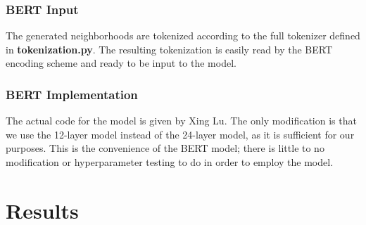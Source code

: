 \documentclass[12pt, a4paper]{article}
\begin{document}
\subsubsection{BERT Input}
The generated neighborhoods are tokenized according to the full tokenizer defined in \textbf{tokenization.py}. The resulting tokenization is easily read by the BERT encoding scheme and ready to be input to the model.


\subsubsection{BERT Implementation}
The actual code for the model is given by Xing Lu. The only modification is that we use the 12-layer model instead of the 24-layer model, as it is sufficient for our purposes. This is the convenience of the BERT model; there is little to no modification or hyperparameter testing to do in order to employ the model.


\section{Results}
\end{document}
